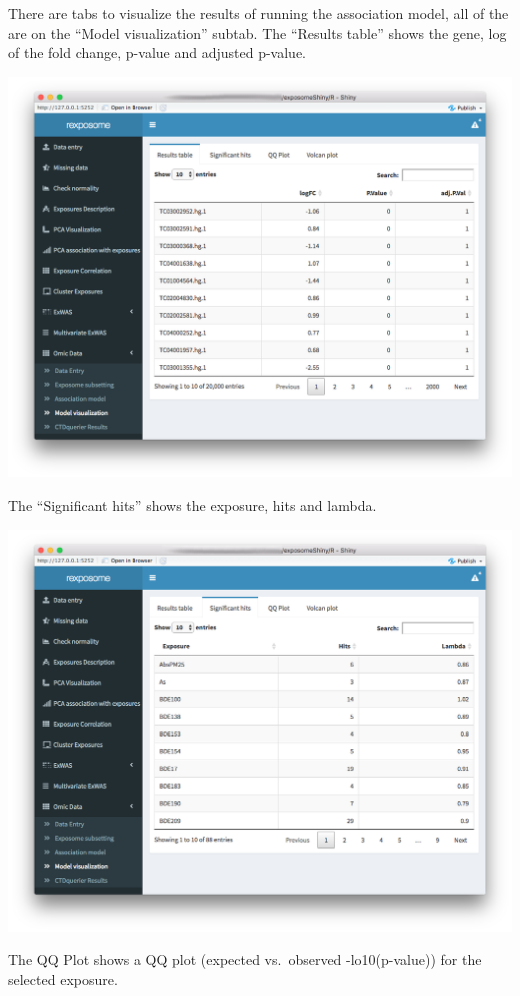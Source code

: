\documentclass[
]{book}
\begin{document}
There are tabs to visualize the results of running the association model, all of the are on the ``Model visualization'' subtab. The ``Results table'' shows the gene, log of the fold change, p-value and adjusted p-value.

\includegraphics{images/analysis9_5.png}

The ``Significant hits'' shows the exposure, hits and lambda.

\includegraphics{images/analysis9_6.png}

The QQ Plot shows a QQ plot (expected vs.~observed -lo10(p-value)) for the selected exposure.
\end{document}
